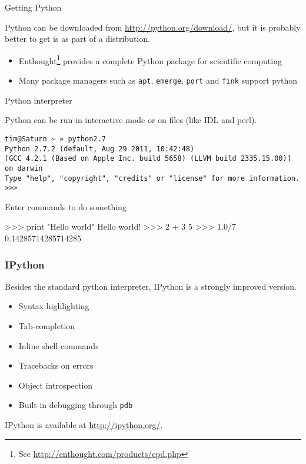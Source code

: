 \documentclass[xetex,10pt]{beamer}
\def\spacer{\vspace*{1em}}
\begin{document}
\begin{frame}[fragile]{Getting Python}
	
	Python can be downloaded from \url{http://python.org/download/}, but it is probably better to get is as part of a distribution.

	\spacer

	\begin{itemize}
		\item Enthought\footnote[frame]{See \url{http://enthought.com/products/epd.php}} provides a complete Python package for scientific computing
		\item Many package managers such as \verb!apt!, \verb!emerge!, \verb!port! and \verb!fink! support python
	\end{itemize}
	
\end{frame}

\begin{frame}[fragile]{Python interpreter}
	
	Python can be run in interactive mode or on files (like IDL and perl).
	
\begin{verbatim}
tim@Saturn ~ » python2.7
Python 2.7.2 (default, Aug 29 2011, 10:42:48) 
[GCC 4.2.1 (Based on Apple Inc. build 5658) (LLVM build 2335.15.00)] on darwin
Type "help", "copyright", "credits" or "license" for more information.
>>> 
\end{verbatim}

Enter commands to do something

\begin{python}
>>> print "Hello world"
Hello world!
>>> 2 + 3
5
>>> 1.0/7
0.14285714285714285
\end{python}

\end{frame}

\begin{frame}[fragile]
	\frametitle{IPython}
	
	Besides the standard python interpreter, IPython is a strongly improved version.

	\spacer

	\begin{itemize}
		\item Syntax highlighting
		\item Tab-completion
		\item Inline shell commands
		\item Tracebacks on errors
		\item Object introspection
		\item Built-in debugging through \verb!pdb!
	\end{itemize}
	
	\spacer
	IPython is available at \url{http://ipython.org/}.
	
\end{frame}
\end{document}
